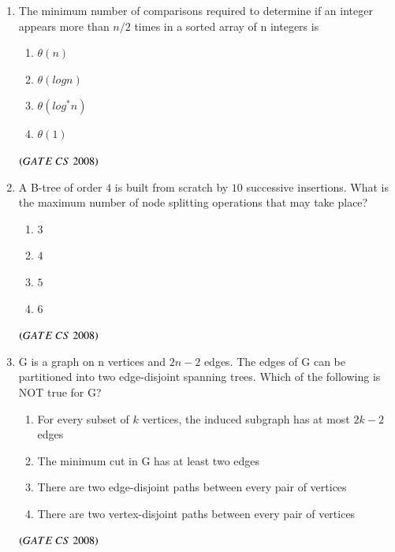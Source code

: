 \documentclass[journal, onecolumn]{IEEEtran}
\numberwithin{equation}{enumi}
\numberwithin{figure}{enumi}
\begin{document}
\begin{enumerate}
\item The minimum number of comparisons required to determine if an integer appears more than $n/2$ times in a sorted array of n integers is
\vspace{-1em}%
\begin{multicols}{4}
\begin{enumerate}
   \item $\theta(n)$
   \item $\theta(logn)$
   \item $\theta(log^*n)$
   \item $\theta(1)$
\end{enumerate}
\end{multicols}
\hfill $\left(GATE\ CS\  2008\right)$

\item A B-tree of order $4$ is built from scratch by $10$ successive insertions. What is the maximum number of node splitting operations that may take place?
\vspace{-1em}%
\begin{multicols}{4}
\begin{enumerate}
   \item $3$
   \item $4$
   \item $5$
   \item $6$
\end{enumerate}
\end{multicols}
\hfill $\left(GATE\ CS\  2008\right)$

\item G is a graph on n vertices and $2n-2$ edges. The edges of G can be partitioned into two edge-disjoint spanning trees. Which of the following is NOT true for G?
\begin{enumerate}
   \item For every subset of $k$ vertices, the induced subgraph has at most $2k-2$ edges 
   \item The minimum cut in G has at least two edges
   \item There are two edge-disjoint paths between every pair of vertices 
   \item There are two vertex-disjoint paths between every pair of vertices 
\end{enumerate}
\hfill $\left(GATE\ CS\  2008\right)$
\bigskip


\end{enumerate}
\end{document}
